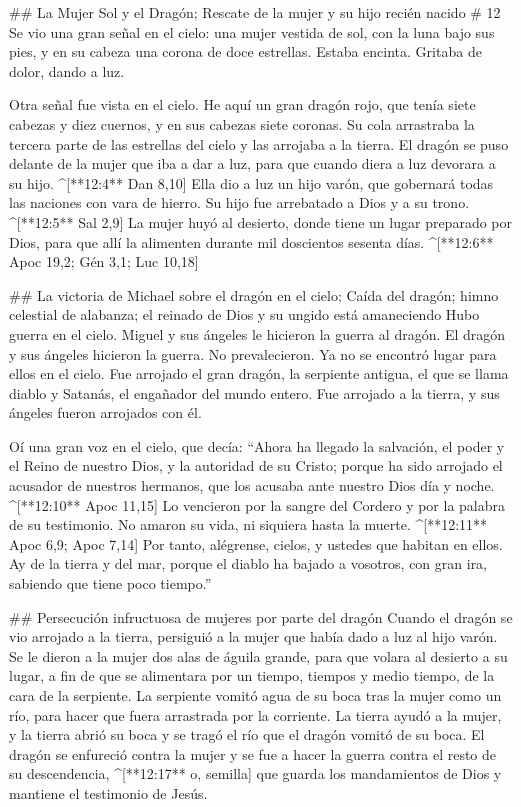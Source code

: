 \begin{paracols}{2}
## La Mujer Sol y el Dragón; Rescate de la mujer y su hijo recién nacido
# 12
 Se vio una gran señal en el cielo: una mujer vestida de sol, con la luna bajo sus pies, y en su cabeza una corona de doce estrellas.  Estaba encinta. Gritaba de dolor, dando a luz.

 Otra señal fue vista en el cielo. He aquí un gran dragón rojo, que tenía siete cabezas y diez cuernos, y en sus cabezas siete coronas.  Su cola arrastraba la tercera parte de las estrellas del cielo y las arrojaba a la tierra. El dragón se puso delante de la mujer que iba a dar a luz, para que cuando diera a luz devorara a su hijo. ^[**12:4** Dan 8,10]  Ella dio a luz un hijo varón, que gobernará todas las naciones con vara de hierro. Su hijo fue arrebatado a Dios y a su trono. ^[**12:5** Sal 2,9]  La mujer huyó al desierto, donde tiene un lugar preparado por Dios, para que allí la alimenten durante mil doscientos sesenta días. ^[**12:6** Apoc 19,2; Gén 3,1; Luc 10,18]

## La victoria de Michael sobre el dragón en el cielo; Caída del dragón; himno celestial de alabanza; el reinado de Dios y su ungido está amaneciendo
 Hubo guerra en el cielo. Miguel y sus ángeles le hicieron la guerra al dragón. El dragón y sus ángeles hicieron la guerra.  No prevalecieron. Ya no se encontró lugar para ellos en el cielo.  Fue arrojado el gran dragón, la serpiente antigua, el que se llama diablo y Satanás, el engañador del mundo entero. Fue arrojado a la tierra, y sus ángeles fueron arrojados con él.

 Oí una gran voz en el cielo, que decía: “Ahora ha llegado la salvación, el poder y el Reino de nuestro Dios, y la autoridad de su Cristo; porque ha sido arrojado el acusador de nuestros hermanos, que los acusaba ante nuestro Dios día y noche. ^[**12:10** Apoc 11,15]  Lo vencieron por la sangre del Cordero y por la palabra de su testimonio. No amaron su vida, ni siquiera hasta la muerte. ^[**12:11** Apoc 6,9; Apoc 7,14]  Por tanto, alégrense, cielos, y ustedes que habitan en ellos. Ay de la tierra y del mar, porque el diablo ha bajado a vosotros, con gran ira, sabiendo que tiene poco tiempo.”

## Persecución infructuosa de mujeres por parte del dragón
 Cuando el dragón se vio arrojado a la tierra, persiguió a la mujer que había dado a luz al hijo varón.  Se le dieron a la mujer dos alas de águila grande, para que volara al desierto a su lugar, a fin de que se alimentara por un tiempo, tiempos y medio tiempo, de la cara de la serpiente.  La serpiente vomitó agua de su boca tras la mujer como un río, para hacer que fuera arrastrada por la corriente.  La tierra ayudó a la mujer, y la tierra abrió su boca y se tragó el río que el dragón vomitó de su boca.  El dragón se enfureció contra la mujer y se fue a hacer la guerra contra el resto de su descendencia, ^[**12:17** o, semilla] que guarda los mandamientos de Dios y mantiene el testimonio de Jesús.


\end{paracols}

